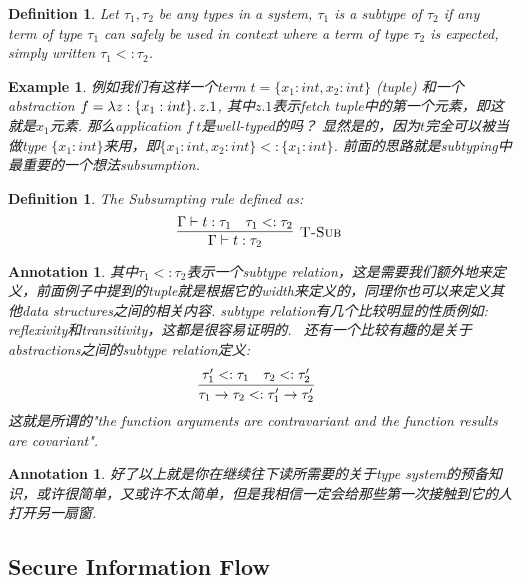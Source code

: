 \documentclass{article}
\newtheorem{example}[theorem]{Example}
\newtheorem{definition}[theorem]{Definition}
\newtheorem{annotation}[theorem]{Annotation}
\newcommand{\lam}[2]{\ensuremath{\lambda #1\ldotp #2}} %
\newcommand{\termtype}[2]{\ensuremath{#1:#2}}
\begin{document}
\begin{definition}
\rm Let $\tau_1,\tau_2$ be any types in a system, $\tau_1$ is a \emph{subtype} of $\tau_2$ if any term of type $\tau_1$ can safely be used in context where a term of type $\tau_2$ is expected, simply written $\tau_1 <: \tau_2$.
\end{definition}

\begin{example}
\rm 例如我们有这样一个term $t = \{x_1:int, x_2:int\}$ (tuple) 和一个abstraction $f = \lam{z:\{x_1:int\}}{z.1}$, 其中$z.1$表示fetch tuple中的第一个元素，即这就是$x_1$元素. 那么application $f~t$是well-typed的吗？ 显然是的，因为$t$完全可以被当做type $\{x_1:int\}$来用，即$\{x_1:int, x_2:int\} <: \{x_1:int\}$. 前面的思路就是subtyping中最重要的一个想法\emph{subsumption}.
\end{example}

\begin{definition}
\rm The Subsumpting rule defined as:
\[
	\infer[\textsc{T-Sub}]{\Gamma \vdash \termtype{t}{\tau_2}}{\Gamma \vdash \termtype{t}{\tau_1} & \tau_1 <: \tau_2}
\]
\end{definition}

\begin{annotation}
\rm 其中$\tau_1 <: \tau_2$表示一个subtype relation，这是需要我们额外地来定义，前面例子中提到的tuple就是根据它的width来定义的，同理你也可以来定义其他data structures之间的相关内容. subtype relation有几个比较明显的性质例如: reflexivity和transitivity，这都是很容易证明的. 
\
还有一个比较有趣的是关于abstractions之间的subtype relation定义:
\[
	\infer[]{\tau_1 \to \tau_2 <: \tau_1' \to \tau_2'}{\tau_1' <: \tau_1 & \tau_2 <: \tau_2'}
\]
这就是所谓的"the function arguments are contravariant and the function results are covariant".
\end{annotation}

\begin{annotation}
\rm 好了以上就是你在继续往下读所需要的关于type system的预备知识，或许很简单，又或许不太简单，但是我相信一定会给那些第一次接触到它的人打开另一扇窗. 
\end{annotation}

\subsection{Secure Information Flow}
\end{document}
